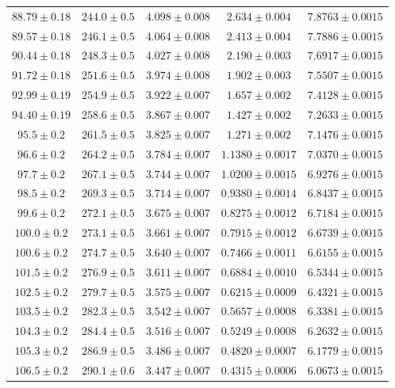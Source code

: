 \documentclass{../concepts/prepareprotokol} %
\begin{document}
\begin{table}[hbtp]
\begin{tabular}{ccccc}
 $88.79 \pm 0.18$ & $244.0 \pm 0.5$ & $4.098 \pm 0.008$ & $2.634 \pm 0.004$ & $7.8763 \pm 0.0015$ \\
 $89.57 \pm 0.18$ & $246.1 \pm 0.5$ & $4.064 \pm 0.008$ & $2.413 \pm 0.004$ & $7.7886 \pm 0.0015$ \\
 $90.44 \pm 0.18$ & $248.3 \pm 0.5$ & $4.027 \pm 0.008$ & $2.190 \pm 0.003$ & $7.6917 \pm 0.0015$ \\
 $91.72 \pm 0.18$ & $251.6 \pm 0.5$ & $3.974 \pm 0.008$ & $1.902 \pm 0.003$ & $7.5507 \pm 0.0015$ \\
 $92.99 \pm 0.19$ & $254.9 \pm 0.5$ & $3.922 \pm 0.007$ & $1.657 \pm 0.002$ & $7.4128 \pm 0.0015$ \\
 $94.40 \pm 0.19$ & $258.6 \pm 0.5$ & $3.867 \pm 0.007$ & $1.427 \pm 0.002$ & $7.2633 \pm 0.0015$ \\
 $95.5 \pm 0.2$ & $261.5 \pm 0.5$ & $3.825 \pm 0.007$ & $1.271 \pm 0.002$ & $7.1476 \pm 0.0015$ \\
 $96.6 \pm 0.2$ & $264.2 \pm 0.5$ & $3.784 \pm 0.007$ & $1.1380 \pm 0.0017$ & $7.0370 \pm 0.0015$ \\
 $97.7 \pm 0.2$ & $267.1 \pm 0.5$ & $3.744 \pm 0.007$ & $1.0200 \pm 0.0015$ & $6.9276 \pm 0.0015$ \\
 $98.5 \pm 0.2$ & $269.3 \pm 0.5$ & $3.714 \pm 0.007$ & $0.9380 \pm 0.0014$ & $6.8437 \pm 0.0015$ \\
 $99.6 \pm 0.2$ & $272.1 \pm 0.5$ & $3.675 \pm 0.007$ & $0.8275 \pm 0.0012$ & $6.7184 \pm 0.0015$ \\
 $100.0 \pm 0.2$ & $273.1 \pm 0.5$ & $3.661 \pm 0.007$ & $0.7915 \pm 0.0012$ & $6.6739 \pm 0.0015$ \\
 $100.6 \pm 0.2$ & $274.7 \pm 0.5$ & $3.640 \pm 0.007$ & $0.7466 \pm 0.0011$ & $6.6155 \pm 0.0015$ \\
 $101.5 \pm 0.2$ & $276.9 \pm 0.5$ & $3.611 \pm 0.007$ & $0.6884 \pm 0.0010$ & $6.5344 \pm 0.0015$ \\
 $102.5 \pm 0.2$ & $279.7 \pm 0.5$ & $3.575 \pm 0.007$ & $0.6215 \pm 0.0009$ & $6.4321 \pm 0.0015$ \\
 $103.5 \pm 0.2$ & $282.3 \pm 0.5$ & $3.542 \pm 0.007$ & $0.5657 \pm 0.0008$ & $6.3381 \pm 0.0015$ \\
 $104.3 \pm 0.2$ & $284.4 \pm 0.5$ & $3.516 \pm 0.007$ & $0.5249 \pm 0.0008$ & $6.2632 \pm 0.0015$ \\
 $105.3 \pm 0.2$ & $286.9 \pm 0.5$ & $3.486 \pm 0.007$ & $0.4820 \pm 0.0007$ & $6.1779 \pm 0.0015$ \\
 $106.5 \pm 0.2$ & $290.1 \pm 0.6$ & $3.447 \pm 0.007$ & $0.4315 \pm 0.0006$ & $6.0673 \pm 0.0015$ \\

\end{tabular}
\end{table}
\end{document}
